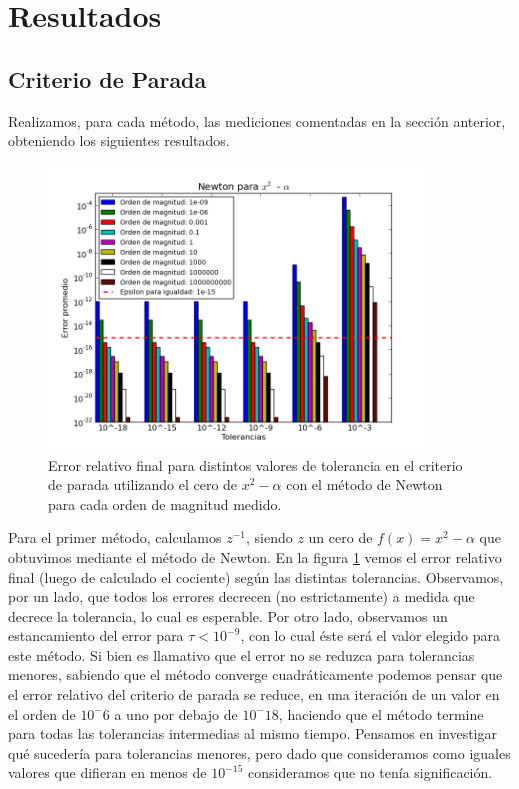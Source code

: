 \section{Resultados}

\subsection{Criterio de Parada}
Realizamos, para cada método, las mediciones comentadas en la sección anterior, obteniendo los siguientes resultados.
\begin{figure}[H]
  \centering
    \includegraphics[width=0.9\textwidth]{../data/NewtonF.png}
    \caption{Error relativo final para distintos valores de tolerancia en el criterio de parada utilizando el cero de $x^2-\alpha$ con el método de Newton para cada orden de magnitud medido.}
    \label{paradaMet0}
\end{figure}

Para el primer método, calculamos $z^{-1}$, siendo $z$ un cero de $f(x) = x^2-\alpha$ que obtuvimos mediante el método de Newton. En la figura \ref{paradaMet0} vemos el error relativo final (luego de calculado el cociente) según las distintas tolerancias. Observamos, por un lado, que todos los errores decrecen (no estrictamente) a medida que decrece la tolerancia, lo cual es esperable. Por otro lado, observamos un estancamiento del error para $\tau < 10^{-9}$, con lo cual éste será el valor elegido para este método. Si bien es llamativo que el error no se reduzca para tolerancias menores, sabiendo que el método converge cuadráticamente podemos pensar que el error relativo del criterio de parada se reduce, en una iteración de un valor en el orden de $10^-6$ a uno por debajo de $10^-18$, haciendo que el método termine para todas las tolerancias intermedias al mismo tiempo. Pensamos en investigar qué sucedería para tolerancias menores, pero dado que consideramos como iguales valores que difieran en menos de $10^{-15}$ consideramos que no tenía significación.

